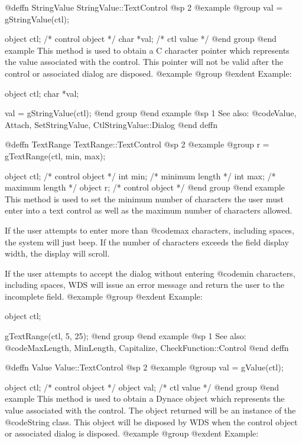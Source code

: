 @deffn {StringValue} StringValue::TextControl
@sp 2
@example
@group
val = gStringValue(ctl);

object  ctl;   /*  control object  */
char    *val;  /*  ctl value       */
@end group
@end example
This method is used to obtain a C character pointer which represents the
value associated with the control.  This pointer will not be valid
after the control or associated dialog are disposed.
@example
@group
@exdent Example:

object  ctl;
char    *val;

val = gStringValue(ctl);
@end group
@end example
@sp 1
See also:  @code{Value, Attach, SetStringValue, CtlStringValue::Dialog}
@end deffn














@deffn {TextRange} TextRange::TextControl
@sp 2
@example
@group
r = gTextRange(ctl, min, max);

object  ctl;   /*  control object  */
int     min;   /*  minimum length  */
int     max;   /*  maximum length  */
object  r;     /*  control object  */
@end group
@end example
This method is used to set the minimum number of characters the user must
enter into a text control as well as the maximum number of characters
allowed.

If the user attempts to enter more than @code{max} characters, including
spaces, the system will just beep.  If the number of characters exceeds
the field display width, the display will scroll.

If the user attempts to accept the dialog without entering @code{min}
characters, including spaces, WDS will issue an error message and return
the user to the incomplete field.
@example
@group
@exdent Example:

object  ctl;

gTextRange(ctl, 5, 25);
@end group
@end example
@sp 1
See also:  @code{MaxLength, MinLength, Capitalize, CheckFunction::Control}
@end deffn











@deffn {Value} Value::TextControl
@sp 2
@example
@group
val = gValue(ctl);

object  ctl;   /*  control object  */
object  val;   /*  ctl value       */
@end group
@end example
This method is used to obtain a Dynace object which represents the value
associated with the control.  The object returned will be an instance of
the @code{String} class.  This object will be disposed by WDS when the
control object or associated dialog is disposed.
@example
@group
@exdent Example:

